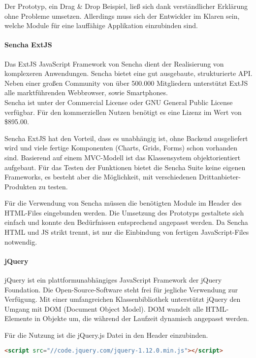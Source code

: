 Der Prototyp, ein Drag \& Drop Beispiel, ließ sich dank verständlicher Erklärung ohne Probleme umsetzen. Allerdings muss sich der Entwickler im Klaren sein, welche Module für eine lauffähige Applikation einzubinden sind. \cite{DOJO}

\paragraph{Sencha ExtJS}
Das ExtJS JavaScript Framework von Sencha dient der Realisierung von komplexeren Anwendungen. Sencha bietet eine gut ausgebaute, strukturierte API. Neben einer großen Community von über 500.000 Mitgliedern unterstützt ExtJS alle marktführenden Webbrowser, sowie Smartphones.\\
Sencha ist unter der Commercial License oder GNU General Public License verfügbar. Für den kommerziellen Nutzen benötigt es eine Lizenz im Wert von \$895.00.\cite{SENCHA}

Sencha ExtJS hat den Vorteil, dass es unabhängig ist, ohne Backend ausgeliefert wird und viele fertige Komponenten (Charts, Grids, Forms) schon vorhanden sind. Basierend auf einem MVC-Modell ist das Klassensystem objektorientiert aufgebaut. Für das Testen der Funktionen bietet die Sencha Suite keine eigenen Frameworks, es besteht aber die Möglichkeit, mit verschiedenen Drittanbieter-Produkten zu testen.\cite{SENCHAFEATURES,SENCHALICENSE}


Für die Verwendung von Sencha müssen die benötigten Module im Header des HTML-Files eingebunden werden. Die Umsetzung des Prototyps gestaltete sich einfach und konnte den Bedürfnissen entsprechend angepasst werden. Da Sencha HTML und JS strikt trennt, ist nur die Einbindung von fertigen JavaScript-Files notwendig.

\paragraph{jQuery}
jQuery ist ein plattformunabhängiges JavaScript Framework der jQuery Foundation. Die Open-Source-Software steht frei für jegliche Verwendung zur Verfügung. Mit einer umfangreichen Klassenbibliothek unterstützt jQuery den Umgang mit DOM (Document Object Model). DOM wandelt alle HTML-Elemente in Objekte um, die während der Laufzeit dynamisch angepasst werden.\cite{JQUERY} 

Für die Nutzung ist die jQuery.js Datei in den Header einzubinden.
\begin{lstlisting}[caption={jQuery einbinden\cite{JQUERYDOWN}}, language=HTML]
<script src="//code.jquery.com/jquery-1.12.0.min.js"></script>
\end{lstlisting}


